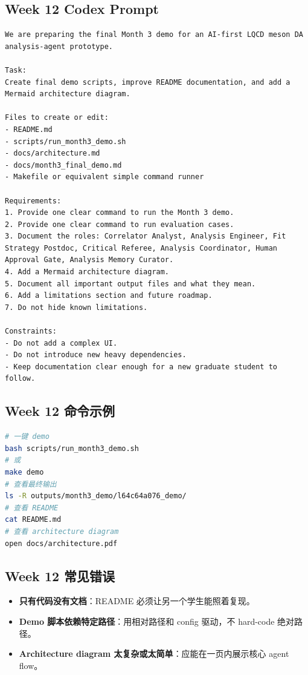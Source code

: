 \documentclass[11pt,a4paper,fontset=none]{ctexart}
\begin{document}
\subsection{Week 12 Codex Prompt}

\begin{lstlisting}
We are preparing the final Month 3 demo for an AI-first LQCD meson DA analysis-agent prototype.

Task:
Create final demo scripts, improve README documentation, and add a Mermaid architecture diagram.

Files to create or edit:
- README.md
- scripts/run_month3_demo.sh
- docs/architecture.md
- docs/month3_final_demo.md
- Makefile or equivalent simple command runner

Requirements:
1. Provide one clear command to run the Month 3 demo.
2. Provide one clear command to run evaluation cases.
3. Document the roles: Correlator Analyst, Analysis Engineer, Fit Strategy Postdoc, Critical Referee, Analysis Coordinator, Human Approval Gate, Analysis Memory Curator.
4. Add a Mermaid architecture diagram.
5. Document all important output files and what they mean.
6. Add a limitations section and future roadmap.
7. Do not hide known limitations.

Constraints:
- Do not add a complex UI.
- Do not introduce new heavy dependencies.
- Keep documentation clear enough for a new graduate student to follow.
\end{lstlisting}

\subsection{Week 12 命令示例}
\begin{lstlisting}[language=bash]
# 一键 demo
bash scripts/run_month3_demo.sh
# 或
make demo
# 查看最终输出
ls -R outputs/month3_demo/l64c64a076_demo/
# 查看 README
cat README.md
# 查看 architecture diagram
open docs/architecture.pdf
\end{lstlisting}

\subsection{Week 12 常见错误}
\begin{itemize}[leftmargin=2em]
  \item \textbf{只有代码没有文档}：README 必须让另一个学生能照着复现。
  \item \textbf{Demo 脚本依赖特定路径}：用相对路径和 config 驱动，不 hard-code 绝对路径。
  \item \textbf{Architecture diagram 太复杂或太简单}：应能在一页内展示核心 agent flow。
\end{itemize}
\end{document}
